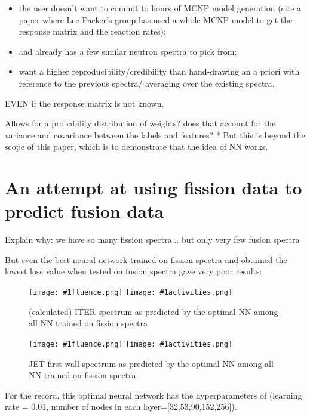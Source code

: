 \documentclass[a4paper, 12pt]{article}
\newcommand{\fluenceandactivities}[1]{
\texttt{[image: \#1fluence.png]}
\texttt{[image: \#1activities.png]}
}
\begin{document}
\begin{itemize}
    \item the user doesn't want to commit to hours of MCNP model generation (cite a paper where Lee Packer's group has used a whole MCNP model to get the response matrix and the reaction rates);
    \item and already has a few similar neutron spectra to pick from;
    \item want a higher reproducibility/credibility than hand-drawing an a priori with reference to the previous spectra/ averaging over the existing spectra.
\end{itemize}

EVEN if the response matrix is not known.

Allows for a probability distribution of weights? does that account for the variance and covariance between the labels and features? *
But this is beyond the scope of this paper, which is to demonstrate that the idea of NN works.

\section{An attempt at using fission data to predict fusion data}
Explain why: we have so many fission spectra... but only very few fusion spectra

But even the best neural network trained on fission spectra and obtained the lowest loss value when tested on fusion spectra gave very poor results:
\begin{figure}
\centering
\fluenceandactivities{/home/ocean/Documents/GitHubDir/unfolding/unfolding/unfoldingsuite/neuralnetwork/realoutputEarlyStopping/SelectedNNreplicated/fission-fusion/0918_0325_5_layer_test_mse_1_test_007_}
\caption{(calculated) ITER spectrum as predicted by the optimal NN among all NN trained on fission spectra} \label{fission-fusionBad}
\end{figure}

\begin{figure}
\centering
\fluenceandactivities{/home/ocean/Documents/GitHubDir/unfolding/unfolding/unfoldingsuite/neuralnetwork/realoutputEarlyStopping/SelectedNNreplicated/fission-fusion/0918_0325_5_layer_test_mse_1_test_016_}
\caption{JET first wall spectrum as predicted by the optimal NN among all NN trained on fission spectra}\label{fission-fusionGood}
\end{figure}

For the record, this optimal neural network has the hyperparameters of (learning rate = 0.01, number of nodes in each layer=[32,53,90,152,256]).
\end{document}
